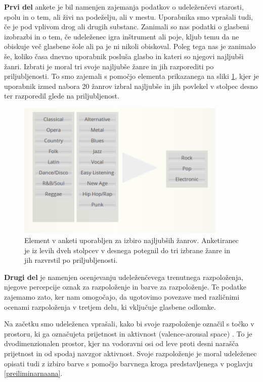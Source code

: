 \documentclass[a4paper, 12pt]{book}
\begin{document}
{\textbf{Prvi del} ankete je bil namenjen zajemanja podatkov o  udeleženčevi starosti, spolu in o tem, ali živi na podeželju, ali v mestu.  Uporabnika smo vprašali tudi, če je pod vplivom drog ali drugih substanc. Zanimali so nas podatki o glasbeni izobrazbi in o tem, če udeleženec igra inštrument ali poje, kljub temu da ne obiskuje več glasbene šole ali pa je ni nikoli obiskoval. Poleg tega nas je zanimalo še, koliko časa dnevno uporabnik posluša glasbo in kateri so njegovi najljubši žanri. Izbrati je moral tri svoje najljubše žanre in jih razporediti po priljubljenosti. To smo zajemali s pomočjo elementa prikazanega na sliki \ref{genresel}, kjer je uporabnik izmed nabora 20 žanrov izbral najljubše in jih povlekel v stolpec desno ter razporedil glede na priljubljenost. 

\begin{figure}[h!t]
\centering
\includegraphics[width=10cm]{genresel.png}

\caption{Element v anketi uporabljen za izbiro najljubših žanrov. Anketiranec je iz levih dveh stolpcev v desnega potegnil do tri izbrane žanre in jih razvrstil po priljubljenosti.}
\label{genresel}
\end{figure}

\textbf{Drugi del} je namenjen ocenjevanju udeleženčevega trenutnega razpoloženja, njegove percepcije oznak za razpoloženje in barve za razpoloženje. Te podatke zajemamo zato, ker nam omogočajo, da ugotovimo povezave med različnimi ocenami razpoloženja v tretjem delu, ki vključuje glasbene odlomke.

Na začetku smo udeleženca vprašali, kako bi svoje razpoloženje označil s točko v prostoru, ki ga označujeta prijetnost in aktivnost (valence-arousal space) \cite{Colibazzi2010}. To je dvodimenzionalen prostor, kjer na vodoravni osi od leve proti desni narašča prijetnost in od spodaj navzgor aktivnost. Svoje razpoloženje je moral udeleženec opisati tudi z izbiro barve s pomočjo barvnega kroga predstavljenega v poglavju \ref{preiliminarnaana}. 

}
\end{document}
